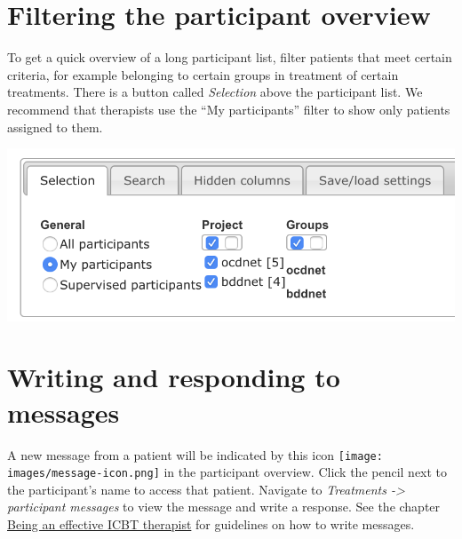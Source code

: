 \documentclass[]{book}
\begin{document}
\hypertarget{filtering-the-participant-overview}{%
\section{Filtering the participant overview}\label{filtering-the-participant-overview}}

To get a quick overview of a long participant list, filter patients that meet certain criteria, for example belonging to certain groups in treatment of certain treatments. There is a button called \emph{Selection} above the participant list. We recommend that therapists use the ``My participants'' filter to show only patients assigned to them.

\includegraphics{images/filter-participants.png}

\hypertarget{writing-and-responding-to-messages}{%
\section{Writing and responding to messages}\label{writing-and-responding-to-messages}}

A new message from a patient will be indicated by this icon \texttt{[image: images/message-icon.png]} in the participant overview. Click the pencil next to the participant's name to access that patient. Navigate to \emph{Treatments -\textgreater{} participant messages} to view the message and write a response. See the chapter \protect\hyperlink{being-an-effective-icbt-therapist}{Being an effective ICBT therapist} for guidelines on how to write messages.
\end{document}
